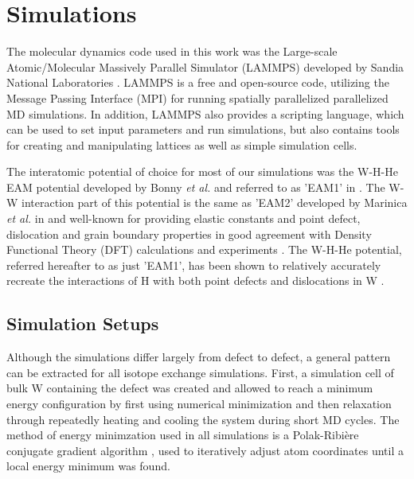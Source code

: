 \chapter{Simulations}

The molecular dynamics code used in this work was the Large-scale Atomic/Molecular Massively Parallel Simulator (LAMMPS) developed by Sandia National Laboratories \cite{lammpsMD}. 
LAMMPS is a free and open-source code, utilizing the Message Passing Interface (MPI) for running spatially parallelized parallelized MD simulations.
In addition, LAMMPS also provides a scripting language, which can be used to set input parameters and run simulations, but also contains tools for creating and manipulating lattices as well as simple simulation cells.    

The interatomic potential of choice for most of our simulations was the W-H-He EAM potential developed by Bonny \textit{et al.} and referred to as 'EAM1' in \cite{bonny2014binding}. 
The W-W interaction part of this potential is the same as 'EAM2' developed by Marinica \textit{et al.} in \cite{marinica2013interatomic} and well-known for providing elastic constants and point defect, dislocation and grain boundary properties in good agreement with Density Functional Theory (DFT) calculations and experiments \cite{bonny2014many}. 
The W-H-He potential, referred hereafter to as just 'EAM1', has been shown to relatively accurately recreate the interactions of H with both point defects and dislocations in W \cite{bonny2014binding, grigorev2015interaction}. 


\section{Simulation Setups}
Although the simulations differ largely from defect to defect, a general pattern can be extracted for all isotope exchange simulations. 
First, a simulation cell of bulk W containing the defect was created and allowed to reach a minimum energy configuration by first using numerical minimization and then relaxation through repeatedly heating and cooling the system during short MD cycles. 
The method of energy minimzation used in all simulations is a Polak-Ribi\`{e}re conjugate gradient algorithm \cite{polak1969note}, used to iteratively adjust atom coordinates until a local energy minimum was found. 

